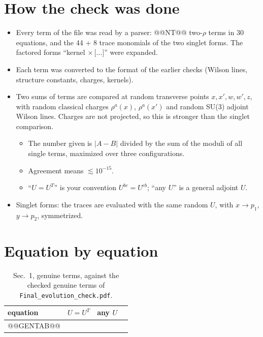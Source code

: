 \documentclass[10pt]{article}
\numberwithin{equation}{section}
\begin{document}
\section{How the check was done}
\begin{itemize}
\item Every term of the file was read by a parser: @@NT@@ two-$\rho$ terms in 30 equations, and the 44 + 8 trace monomials of the two singlet forms. The factored forms ``kernel $\times\,\big[\dots\big]$'' were expanded.
\item Each term was converted to the format of the earlier checks (Wilson lines, structure constants, charges, kernels).
\item Two sums of terms are compared at random transverse points $x, x', w, w', z$, with random classical charges $\rho^a(x)$, $\rho^a(x')$ and random SU(3) adjoint Wilson lines. Charges are not projected, so this is stronger than the singlet comparison.
\begin{itemize}
\item The number given is $|A-B|$ divided by the sum of the moduli of all single terms, maximized over three configurations.
\item Agreement means $\lesssim10^{-15}$.
\item ``$U=U^T$'' is your convention $U^{bc}=U^{cb}$; ``any $U$'' is a general adjoint $U$.
\end{itemize}
\item Singlet forms: the traces are evaluated with the same random $U$, with $x\to p_1$, $y\to p_2$, symmetrized.
\end{itemize}

\section{Equation by equation}
\begin{table}[H]\centering\small
\caption{Sec.~1, genuine terms, against the checked genuine terms of \texttt{Final\_evolution\_check.pdf}.}\label{tab:gen}
\begin{tabular}{@{}lccl@{}}\toprule
equation & $U=U^T$ & any $U$ & \\\midrule
@@GENTAB@@
\bottomrule
\end{tabular}
\end{table}
\end{document}

